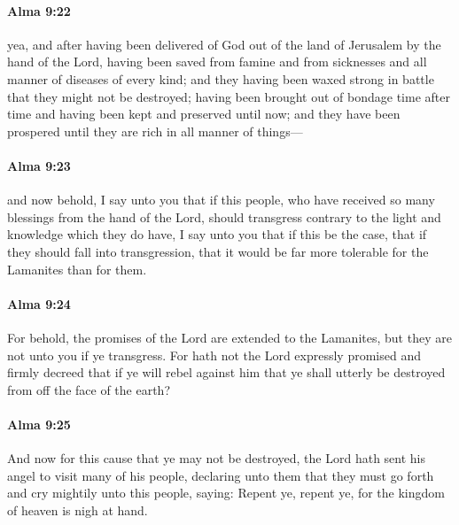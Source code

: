 		\paragraph{Alma 9:22} %
			\label{ALMA-9-22}

			yea, and after having been delivered of God
			out of the land of Jerusalem by the hand of the Lord,
			having been saved from famine
			and from sicknesses and all manner of diseases of every kind;
			and they having been waxed strong in battle that they might not be destroyed;
			having been brought out of bondage time after time
			and having been kept and preserved until now;
			and they have been prospered until they are rich in all manner of things---

		\paragraph{Alma 9:23} %
			\label{ALMA-9-23}

			and now behold, I say unto you that
			if this people, who have received so many blessings from the hand of the Lord,
			should transgress contrary to the light and knowledge which they do have,
			I say unto you that if this be the case,
			that if they should fall into transgression,
			that it would be far more tolerable for the Lamanites than for them.

		\paragraph{Alma 9:24} %
			\label{ALMA-9-24}

			For behold, the promises of the Lord are extended to the Lamanites,
			but they are not unto you if ye transgress.
			For hath not the Lord expressly promised and firmly decreed
			that if ye will rebel against him
			that ye shall utterly be destroyed from off the face of the earth?

		\paragraph{Alma 9:25} %
			\label{ALMA-9-25}

			And now for this cause that ye may not be destroyed,
			the Lord hath sent his angel to visit many of his people,
			declaring unto them that they must go forth
			and cry mightily unto this people, saying:
			Repent ye, repent ye,
			for the kingdom of heaven is nigh at hand.

